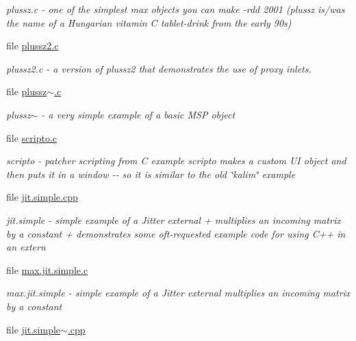 \begin{DoxyCompactItemize}
\begin{DoxyCompactList}\small\item\em plussz.c -\/ one of the simplest max objects you can make -\/rdd 2001 (plussz is/was the name of a Hungarian vitamin C tablet-\/drink from the early 90s) \item\end{DoxyCompactList}\item 
file \hyperlink{plussz2_8c}{plussz2.c}


\begin{DoxyCompactList}\small\item\em plussz2.c -\/ a version of plussz2 that demonstrates the use of proxy inlets. \item\end{DoxyCompactList}\item 
file \hyperlink{plussz~_8c}{plussz$\sim$.c}


\begin{DoxyCompactList}\small\item\em plussz$\sim$ -\/ a very simple example of a basic MSP object \item\end{DoxyCompactList}\item 
file \hyperlink{scripto_8c}{scripto.c}


\begin{DoxyCompactList}\small\item\em scripto -\/ patcher scripting from C example scripto makes a custom UI object and then puts it in a window -\/-\/ so it is similar to the old \char`\"{}kalim\char`\"{} example \item\end{DoxyCompactList}\item 
file \hyperlink{jit_8simple_8cpp}{jit.simple.cpp}


\begin{DoxyCompactList}\small\item\em jit.simple -\/ simple example of a Jitter external + multiplies an incoming matrix by a constant + demonstrates some oft-\/requested example code for using C++ in an extern \item\end{DoxyCompactList}\item 
file \hyperlink{max_8jit_8simple_8c}{max.jit.simple.c}


\begin{DoxyCompactList}\small\item\em max.jit.simple -\/ simple example of a Jitter external multiplies an incoming matrix by a constant \item\end{DoxyCompactList}\item 
file \hyperlink{jit_8simple~_8cpp}{jit.simple$\sim$.cpp}



\end{DoxyCompactItemize}

